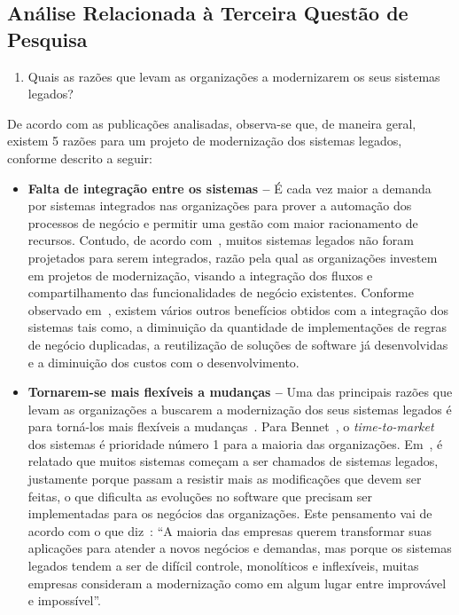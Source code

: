 \subsection{An\'{a}lise Relacionada à Terceira Questão de Pesquisa}

\begin{enumerate}[(QP3)]

\item Quais as razões que levam as organizações a modernizarem os seus sistemas legados?

\end{enumerate}

De acordo com as publicações analisadas, observa-se que, de maneira geral, existem 5 razões para um projeto de modernização dos sistemas legados, conforme descrito a seguir: 

\begin{itemize}

\item \textbf{Falta de integração entre os sistemas --} É cada vez maior a demanda por sistemas integrados nas 
organizações para prover a automação dos processos de negócio e permitir uma gestão com maior racionamento de recursos. 
Contudo, de acordo com~\cite{S3_Bisbal:1999, S29_Chung:2007, S31_LiuYan:2008}, muitos sistemas legados não foram projetados 
para serem integrados, razão pela qual as organizações investem em projetos de modernização, visando a integração dos fluxos e 
compartilhamento das funcionalidades de negócio existentes. Conforme 
observado em~\cite{S4_bennett1995legacy, S15_Comella-DordaASurvey2000, S2_erlikh:2000, Umar:2009}, 
existem vários outros benefícios obtidos com a integração dos sistemas tais como, a diminuição da quantidade de implementa\c c\~{o}es de regras 
de neg\'{o}cio duplicadas, a reutilização de soluções de software já desenvolvidas e a 
diminuição dos custos com o desenvolvimento.

\item \textbf{Tornarem-se mais flexíveis a mudanças --} Uma das principais razões que levam as organizações a buscarem a modernização 
dos seus sistemas legados é para torná-los mais flexíveis 
a mudanças~\cite{S4_bennett1995legacy, S01_bennett2000software, S3_Bisbal:1999, S15_Comella-DordaASurvey2000, S13_ransom1998method, 
S12_WeidermanApproaches:1997}. 
Para Bennet~\cite{S4_bennett1995legacy}, o \textit{time-to-market} dos sistemas é prioridade número 1 para a maioria das organizações. 
Em~\cite{S3_Bisbal:1999, S4_bennett1995legacy}, é relatado que muitos sistemas começam a ser chamados de sistemas legados, justamente porque 
passam a resistir mais as modificações que devem ser feitas, o que dificulta as evoluções no software que precisam ser implementadas para os negócios das organizações. 
Este pensamento vai de acordo com o que diz~\cite{S2_erlikh:2000}: ``A maioria das empresas querem transformar suas aplicações para atender a novos negócios e demandas, 
mas porque os sistemas legados tendem a ser de difícil controle, monolíticos e inflexíveis, muitas empresas consideram a modernização como em algum lugar entre improvável e impossível''. 


\end{itemize}
